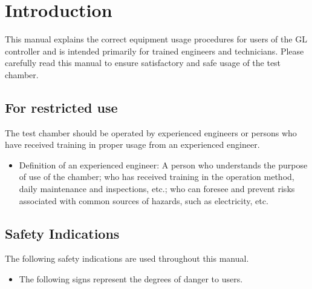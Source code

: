 \chapter{Introduction}

This manual explains the correct equipment usage procedures for users of
the GL controller and is intended primarily for trained engineers and
technicians. Please carefully read this manual to ensure satisfactory
and safe usage of the test chamber.


\section{For restricted use}

The test chamber should be operated by experienced engineers or persons
who have received training in proper usage from an experienced engineer.

\begin{itemize}
\tightlist
\item
  Definition of an experienced engineer: A person who understands the
  purpose of use of the chamber; who has received training in the
  operation method, daily maintenance and inspections, etc.; who can
  foresee and prevent risks associated with common sources of hazards,
  such as electricity, etc.
\end{itemize}


\section{Safety Indications}

The following safety indications are used throughout this manual.

\begin{itemize}
\tightlist
\item
  The following signs represent the degrees of danger to users.
\end{itemize}

